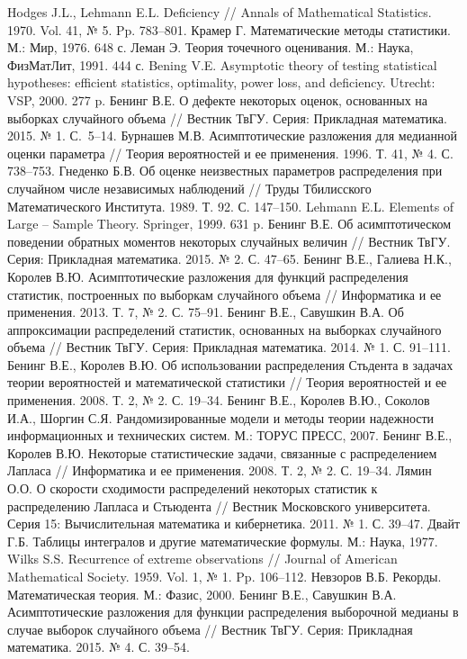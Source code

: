 \documentclass[a4paper,twoside]{article}
\theoremstyle{theorem}
\theoremstyle{remark}
\begin{document}
\bigskip\bigskip{}
\begin{thebibliography}{99}
 Hodges J.L., Lehmann E.L. Deficiency // Annals of Mathematical Statistics. 1970. Vol. 41, № 5. Pp. 783--801.
 Крамер Г. Математические методы статистики. М.: Мир, 1976. 648 с.
 Леман Э. Теория точечного оценивания. М.: Наука, ФизМатЛит, 1991. 444 с.
\bibitem{} Bening V.E. Asymptotic theory of testing statistical hypotheses: efficient statistics, optimality, power loss, and deficiency. Utrecht: VSP, 2000. 277 p.
\bibitem{} Бенинг В.Е. О дефекте некоторых оценок, основанных на выборках случайного объема // Вестник ТвГУ. Серия: Прикладная математика. 2015. № 1. С.~5--14.
\bibitem{} Бурнашев М.В. Асимптотические разложения для медианной оценки параметра // Теория вероятностей и ее применения. 1996. Т. 41, № 4. С. 738--753.
\bibitem{} Гнеденко Б.В. Об оценке неизвестных параметров распределения при случайном числе независимых наблюдений // Труды Тбилисского Математического Института. 1989. Т. 92. С. 147--150.
\bibitem{} Lehmann E.L. Elements of Large -- Sample Theory. Springer, 1999. 631 p.
\bibitem{} Бенинг В.Е. Об асимптотическом поведении обратных моментов некоторых случайных величин // Вестник ТвГУ. Серия: Прикладная математика. 2015. № 2. С. 47--65.
\bibitem{} Бенинг В.Е., Галиева Н.К., Королев В.Ю. Асимптотические разложения для функций распределения статистик, построенных по выборкам случайного объема // Информатика и ее применения. 2013. Т. 7, № 2. С. 75--91.
\bibitem{} Бенинг В.Е., Савушкин В.А. Об аппроксимации распределений статистик, основанных на выборках случайного объема // Вестник ТвГУ. Серия: Прикладная математика. 2014. № 1. С. 91--111.
\bibitem{} Бенинг В.Е., Королев В.Ю. Об использовании распределения Стьдента в задачах теории вероятностей и математической статистики // Теория вероятностей и ее применения. 2008. Т. 2, № 2. С. 19--34.
\bibitem{} Бенинг В.Е., Королев В.Ю., Соколов И.А., Шоргин С.Я. Рандомизированные модели и методы теории надежности информационных и технических систем. М.: ТОРУС ПРЕСС, 2007.
 Бенинг В.Е., Королев В.Ю. Некоторые статистические задачи, связанные с распределением Лапласа // Информатика и ее применения.
2008. Т. 2, № 2. С. 19--34.
 Лямин О.О. О скорости сходимости распределений некоторых статистик к распределению Лапласа и Стьюдента // Вестник Московского университета. Серия 15: Вычислительная математика и кибернетика. 2011. № 1. С. 39--47.
 Двайт Г.Б. Таблицы интегралов и другие математические формулы. М.: Наука, 1977.
 Wilks S.S. Recurrence of extreme observations // Journal of American Mathematical Society. 1959. Vol. 1, № 1. Pp. 106--112.
 Невзоров В.Б. Рекорды. Математическая теория. М.: Фазис, 2000.
\bibitem{} Бенинг В.Е., Савушкин В.А. Асимптотические разложения для функции распределения выборочной медианы в случае выборок случайного объема // Вестник ТвГУ. Серия: Прикладная математика. 2015. № 4. С. 39--54.
\end{thebibliography}
\end{document}
